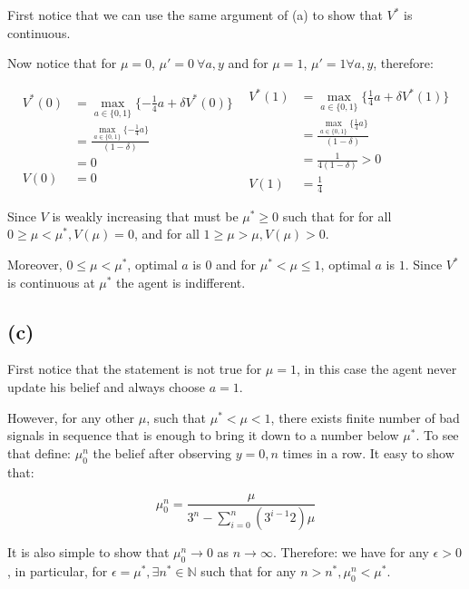 \documentclass{article}
\begin{document}
First notice that we can use the same argument of (a) to show that $V^*$ is continuous.

Now notice that for $\mu = 0$, $\mu' = 0\ \forall a,y$ and for $\mu = 1$,
$\mu' = 1 \forall a,y$, therefore:

\[
  \begin{split}
    V^*(0) & =  \max_{a \in \{0, 1\}}\{- \frac{1}{4}a + \delta V^*(0) \} \\
           & = \frac{\max_{a \in \{0, 1\}}\{- \frac{1}{4}a\}}{(1 - \delta)} \\
           & = 0 \\
    V(0)   & = 0
  \end{split}
  \ \    
  \begin{split}
    V^*(1) & =  \max_{a \in \{0, 1\}}\{\frac{1}{4}a + \delta V^*(1) \} \\
           & = \frac{\max_{a \in \{0, 1\}}\{\frac{1}{4}a\}}{(1 - \delta)} \\
           & = \frac{1}{4(1 - \delta)} > 0 \\
    V(1)   & = \frac{1}{4}
  \end{split}
\]

Since $V$ is weakly increasing that must be $\mu^* \ge 0$ such that for for all 
$0 \ge \mu < \mu^*, V(\mu) = 0$, and for all $1 \ge \mu > \mu, V(\mu) > 0$.

Moreover, $0 \le \mu < \mu^*$, optimal $a$ is $0$ and for $\mu^* < \mu \le 1$, 
optimal $a$ is $1$. Since $V^*$ is continuous at $\mu^*$ the agent is indifferent.

\subsection{(c)} %

First notice that the statement is not true for $\mu = 1$, in this case the agent
never update his belief and always choose $a = 1$.

However, for any other $\mu$, such that $\mu^* < \mu < 1$, there exists finite number of bad signals
in sequence that is enough to bring it down to a number below $\mu^*$. To see that define:
$\mu_0^n$ the belief after observing $y = 0, n$ times in a row. It easy to show that:

\[
  \mu_0^n = \frac{\mu}{3^n - \sum_{i = 0}^n(3^{i-1}2)\mu}
\]

It is also simple to show that $\mu_0^n \to 0$ as $n \to \infty$. Therefore:
we have for any $\epsilon > 0$, in particular, for $\epsilon = \mu^*, \exists
n^* \in \mathbb{N}$ such that for any $n > n^*, \mu_0^n < \mu^*$.
\end{document}

